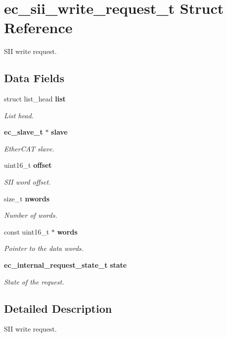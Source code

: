 \section{ec\-\_\-sii\-\_\-write\-\_\-request\-\_\-t \-Struct \-Reference}
\label{structec__sii__write__request__t}


\-S\-I\-I write request.  


\subsection*{\-Data \-Fields}
\begin{DoxyCompactItemize}
\item 
struct list\-\_\-head {\bf list}
\begin{DoxyCompactList}\small\item\em \-List head. \end{DoxyCompactList}\item 
{\bf ec\-\_\-slave\-\_\-t} $\ast$ {\bf slave}
\begin{DoxyCompactList}\small\item\em \-Ether\-C\-A\-T slave. \end{DoxyCompactList}\item 
uint16\-\_\-t {\bf offset}
\begin{DoxyCompactList}\small\item\em \-S\-I\-I word offset. \end{DoxyCompactList}\item 
size\-\_\-t {\bf nwords}
\begin{DoxyCompactList}\small\item\em \-Number of words. \end{DoxyCompactList}\item 
const uint16\-\_\-t $\ast$ {\bf words}
\begin{DoxyCompactList}\small\item\em \-Pointer to the data words. \end{DoxyCompactList}\item 
{\bf ec\-\_\-internal\-\_\-request\-\_\-state\-\_\-t} {\bf state}
\begin{DoxyCompactList}\small\item\em \-State of the request. \end{DoxyCompactList}\end{DoxyCompactItemize}


\subsection{\-Detailed \-Description}
\-S\-I\-I write request. 

